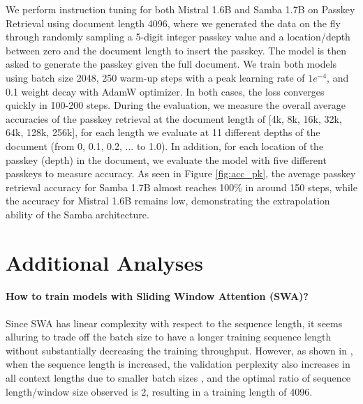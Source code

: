 \documentclass{article}
\begin{document}
We perform instruction tuning for both Mistral 1.6B and Samba 1.7B on Passkey Retrieval using document length 4096, where we generated the data on the fly through randomly sampling a 5-digit integer passkey value and a location/depth between zero and the document length to insert the passkey. The model is then asked to generate the passkey given the full document. We train both models using batch size 2048, 250 warm-up steps with a peak learning rate of $1e^{-4}$, and 0.1 weight decay with AdamW \citep{adw} optimizer. In both cases, the loss converges quickly in 100-200 steps. During the evaluation, we measure the overall average accuracies of the passkey retrieval at the document length of [4k, 8k, 16k, 32k, 64k, 128k, 256k], for each length we evaluate at 11 different depths of the document (from 0, 0.1, 0.2, ... to 1.0). In addition, for each location of the passkey (depth) in the document, we evaluate the model with five different passkeys to measure accuracy. As seen in Figure \ref{fig:acc_pk}, the average passkey retrieval accuracy for Samba 1.7B almost reaches 100\% in around 150 steps, while the accuracy for Mistral 1.6B remains low, demonstrating the extrapolation ability of the Samba architecture. 




\section{Additional Analyses} \label{add_ana}

\paragraph{How to train models with Sliding Window Attention (SWA)?}

Since SWA has linear complexity with respect to the sequence length, it seems alluring to trade off the batch size to have a longer training sequence length without substantially decreasing the training throughput. However, as shown in , when the sequence length is increased, the validation perplexity also increases in all context lengths due to smaller batch sizes \citep{varis-bojar-2021-sequence}, and the optimal ratio of sequence length/window size observed is 2, resulting in a training length of 4096.
\end{document}
